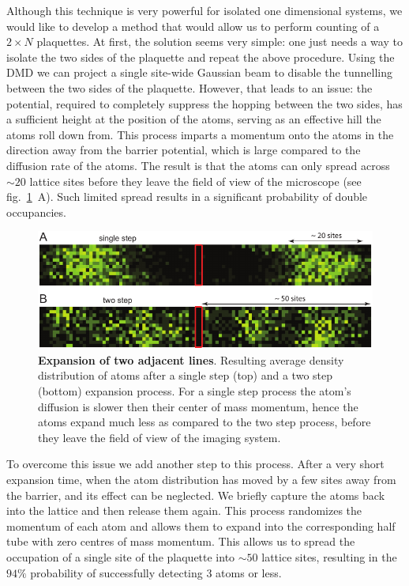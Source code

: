 Although this technique is very powerful for isolated one dimensional systems, we would like to develop a method that would allow us to perform counting of a $2\times N$ plaquettes. At first, the solution seems very simple: one just needs a way to isolate the two sides of the plaquette and repeat the above procedure. Using the DMD we can project a single site-wide Gaussian beam to disable the tunnelling between the two sides of the plaquette. However, that leads to an issue: the potential, required to completely suppress the hopping between the two sides, has a sufficient height at the position of the atoms, serving as an effective hill the atoms roll down from. This process imparts a momentum onto the atoms in the direction away from the barrier potential, which is large compared to the diffusion rate of the atoms. The result is that the atoms can only spread across $\sim 20$ lattice sites before they leave the field of view of the microscope (see fig.~\ref{fig:CTE_expansion}~A). Such limited spread results in a significant probability of double occupancies.

\begin{figure}[t]
	\centering
	\includegraphics[scale=1]{figures/CTE_expansion.pdf}
	\caption{{\bf Expansion of two adjacent lines}. Resulting average density distribution of atoms after a single step (top) and a two step (bottom) expansion process. For a single step process the atom's diffusion is slower then their center of mass momentum, hence the atoms expand much less as compared to the two step process, before they leave the field of view of the imaging system.}
	\label{fig:CTE_expansion}
\end{figure}

To overcome this issue we add another step to this process. After a very short expansion time, when the atom distribution has moved by a few sites away from the barrier, and its effect can be neglected. We briefly capture the atoms back into the lattice and then release them again. This process randomizes the momentum of each atom and allows them to expand into the corresponding half tube with zero centres of mass momentum. This allows us to spread the occupation of a single site of the plaquette into $\sim 50$ lattice sites, resulting in the $94\%$ probability of successfully detecting $3$ atoms or less. 